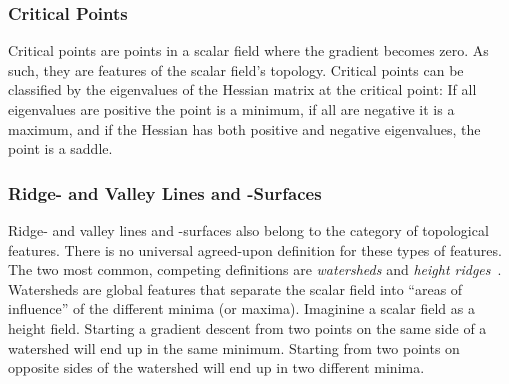 %
\subsubsection{Critical Points}
%
Critical points are points in a scalar field where the gradient becomes zero.
%
As such, they are features of the scalar field's topology.
%
Critical points can be classified by the eigenvalues of the Hessian matrix at
the critical point:
%
If all eigenvalues are positive the point is a minimum, if all are negative it
is a maximum, and if the Hessian has both positive and negative eigenvalues,
the point is a saddle.
%

%
\subsubsection{Ridge- and Valley Lines and -Surfaces}
%
Ridge- and valley lines and -surfaces also belong to the category
of topological features.
%
There is no universal agreed-upon definition for these types of features.
%
The two most common, competing definitions are \emph{watersheds} and
\emph{height ridges}~\cite{Peikert2008,Eberly2012}.
%
Watersheds are global features that separate the scalar field into ``areas of
influence'' of the different minima (or maxima).
%
Imaginine a scalar field as a height field.
%
Starting a gradient descent from two points on the same side of a watershed
will end up in the same minimum.
%
Starting from two points on opposite sides of the watershed will end up in two
different minima.
%

